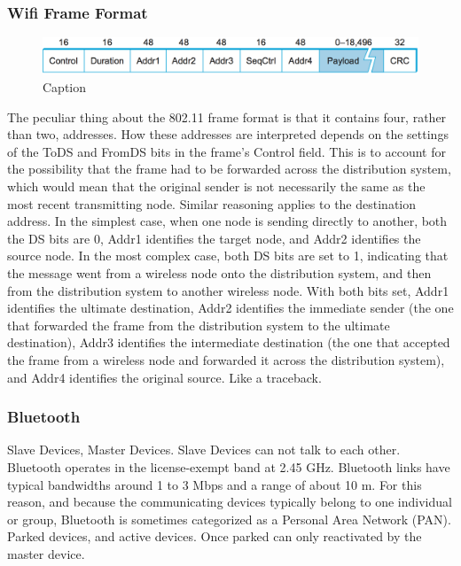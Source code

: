 \documentclass[11pt, a4paper]{article}
\begin{document}
\subsubsection{Wifi Frame Format}
\begin{figure}[H]
    \centering
    \includegraphics[width = \textwidth]{Pictures/Wifi Frame Format.png}
    \caption{Caption}
    \label{fig:my_label}
\end{figure}
The peculiar thing about the 802.11 frame format is that it contains four, rather than two, addresses. How these addresses are interpreted depends on the settings of the ToDS and FromDS bits in the frame’s Control field. This is to account for the possibility that the frame had to be forwarded across the distribution system, which would mean that the original sender is not necessarily the same as the most recent transmitting node. Similar reasoning applies to the destination address. In the simplest case, when one node is sending directly to another, both the DS bits are 0, Addr1 identifies the target node, and Addr2 identifies the source node. In the most complex case, both DS bits are set to 1, indicating that the message went from a wireless node onto the distribution system, and then from the distribution system to another wireless node. With both bits set, Addr1 identifies the ultimate destination, Addr2 identifies the immediate sender (the one that forwarded the frame from the distribution system to the ultimate destination), Addr3 identifies the intermediate destination (the one that accepted the frame from a wireless node and forwarded it across the distribution system), and Addr4 identifies the original source. Like a traceback.

\subsubsection{Bluetooth}
Slave Devices, Master Devices. Slave Devices can not talk to each other. Bluetooth operates in the license-exempt band at 2.45 GHz. Bluetooth links have typical bandwidths around 1 to 3 Mbps and a range of about 10 m. For this reason, and because the communicating devices typically belong to one individual or group, Bluetooth is sometimes categorized as a Personal Area Network (PAN). Parked devices, and active devices. Once parked can only reactivated by the master device.
\end{document}
